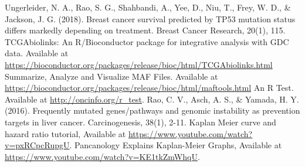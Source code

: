 \documentclass[12pt, ]{article}
\begin{document}
\begin{thebibliography}{9}
     Ungerleider, N. A., Rao, S. G., Shahbandi, A., Yee, D., Niu, T., Frey, W. D., \& Jackson, J. G. (2018). Breast cancer survival predicted by TP53 mutation status differs markedly depending on treatment. Breast Cancer Research, 20(1), 115.
     TCGAbiolinks: An R/Bioconductor package for integrative analysis with GDC data. Available at \url{https://bioconductor.org/packages/release/bioc/html/TCGAbiolinks.html}
     Summarize, Analyze and Visualize MAF Files. Available at \url{https://bioconductor.org/packages/release/bioc/html/maftools.html}
      An R Test. Available at \url{http://oncinfo.org/r_test}.
     Rao, C. V., Asch, A. S., & Yamada, H. Y. (2016). Frequently mutated genes/pathways and genomic instability as prevention targets in liver cancer. Carcinogenesis, 38(1), 2-11.
    \bibitem {}  Kaplan Meier curve and hazard ratio tutorial, Available at \url{https://www.youtube.com/watch?v=pxRCpcRupgU}.
    \bibitem {} Pancanology Explains Kaplan-Meier Graphs, Available at \url{https://www.youtube.com/watch?v=KE1tkZmWhqU}.


\end{thebibliography}
\end{document}
